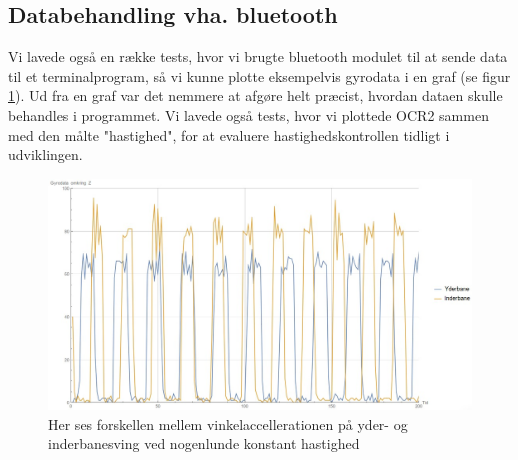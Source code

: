 \pagebreak

\subsection{Databehandling vha. bluetooth}

Vi lavede også en række tests, hvor vi brugte bluetooth modulet til at sende data til et terminalprogram, så vi kunne plotte eksempelvis gyrodata i en graf (se figur \ref{fig:Gyro}). Ud fra en graf var det nemmere at afgøre helt præcist, hvordan dataen skulle behandles i programmet. Vi lavede også tests, hvor vi plottede OCR2 sammen med den målte "hastighed", for at evaluere hastighedskontrollen tidligt i udviklingen.

\begin{figure}[h]

	\centering
		\includegraphics[scale=0.4]{Billeder/Gyro.jpg}
	\caption{Her ses forskellen mellem vinkelaccellerationen på yder- og inderbanesving ved nogenlunde konstant hastighed}
	\label{fig:Gyro}
	
\end{figure}

